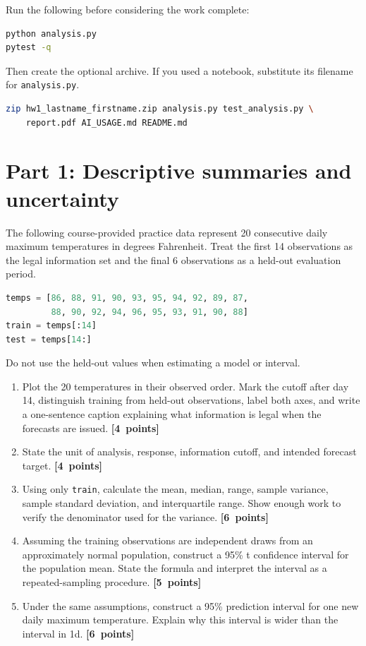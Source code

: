 \documentclass[11pt]{article}
\newcommand{\points}[1]{\nobreak\hfill\mbox{\textcolor{GTBlue}{\textbf{[#1 points]}}}}
\begin{document}
Run the following before considering the work complete:
\begin{lstlisting}[language=bash]
python analysis.py
pytest -q
\end{lstlisting}

Then create the optional archive. If you used a notebook, substitute its filename for \texttt{analysis.py}.
\begin{lstlisting}[language=bash]
zip hw1_lastname_firstname.zip analysis.py test_analysis.py \
    report.pdf AI_USAGE.md README.md
\end{lstlisting}

\section*{Part 1: Descriptive summaries and uncertainty}

The following course-provided practice data represent 20 consecutive daily maximum temperatures in degrees Fahrenheit. Treat the first 14 observations as the legal information set and the final 6 observations as a held-out evaluation period.

\begin{lstlisting}[language=Python]
temps = [86, 88, 91, 90, 93, 95, 94, 92, 89, 87,
         88, 90, 92, 94, 96, 95, 93, 91, 90, 88]
train = temps[:14]
test = temps[14:]
\end{lstlisting}

Do not use the held-out values when estimating a model or interval.

\begin{enumerate}[label=\textbf{1\alph*.}]
  \item Plot the 20 temperatures in their observed order. Mark the cutoff after day 14, distinguish training from held-out observations, label both axes, and write a one-sentence caption explaining what information is legal when the forecasts are issued. \points{4}
  \item State the unit of analysis, response, information cutoff, and intended forecast target. \points{4}
  \item Using only \texttt{train}, calculate the mean, median, range, sample variance, sample standard deviation, and interquartile range. Show enough work to verify the denominator used for the variance. \points{6}
  \item Assuming the training observations are independent draws from an approximately normal population, construct a 95\% t confidence interval for the population mean. State the formula and interpret the interval as a repeated-sampling procedure. \points{5}
  \item Under the same assumptions, construct a 95\% prediction interval for one new daily maximum temperature. Explain why this interval is wider than the interval in 1d. \points{6}
\end{enumerate}
\end{document}
